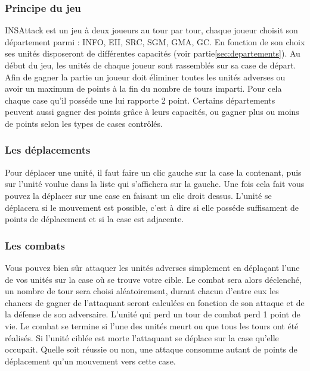 \subsubsection{Principe du jeu}
INSAttack est un jeu à deux joueurs au tour par tour, chaque joueur choisit son département parmi : INFO, EII, SRC, SGM, GMA, GC. En fonction de son choix ses unités disposeront de différentes capacités (voir partie\ref{sec:departements}). Au début du jeu, les unités de chaque joueur sont rassemblés sur sa case de départ. Afin de gagner la partie un joueur doit éliminer toutes les unités adverses ou avoir un maximum de points à la fin du nombre de tours imparti. Pour cela chaque case qu'il posséde une lui rapporte 2 point. Certains départements peuvent aussi gagner des points grâce à leurs capacités, ou gagner plus ou moins de points selon les types de cases contrôlés.

\subsubsection{Les déplacements}
Pour déplacer une unité, il faut faire un clic gauche sur la case la contenant, puis sur l'unité voulue dans la liste qui s'affichera sur la gauche. Une fois cela fait vous pouvez la déplacer sur une case en faisant un clic droit dessus. L'unité se déplacera si le mouvement est possible, c'est à dire si elle posséde suffisament de points de déplacement et si la case est adjacente.

\subsubsection{Les combats}
Vous pouvez bien sûr attaquer les unités adverses simplement en déplaçant l'une de vos unités sur la case où se trouve votre cible. Le combat sera alors déclenché, un nombre de tour sera choisi aléatoirement, durant chacun d'entre eux les chances de gagner de l'attaquant seront calculées en fonction de son attaque et de la défense de son adversaire. L'unité qui perd un tour de combat perd 1 point de vie. Le combat se termine si l'une des unités meurt ou que tous les tours ont été réalisés. Si l'unité ciblée est morte l'attaquant se déplace sur la case qu'elle occupait. Quelle soit réussie ou non, une attaque consomme autant de points de déplacement qu'un mouvement vers cette case.